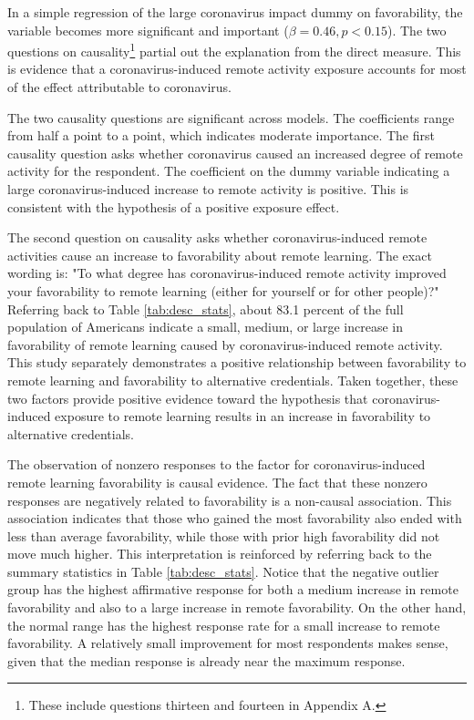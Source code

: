 \documentclass[review]{elsarticle}
\begin{document}
In a simple regression of the large coronavirus impact dummy on favorability,
the variable becomes more significant and important ($\beta = 0.46, p < 0.15$).
The two questions on causality\footnote{These include questions thirteen and fourteen in Appendix A.}
partial out the explanation from the direct measure.
This is evidence that a coronavirus-induced remote activity exposure accounts for most of the effect attributable to coronavirus.

The two causality questions are significant across models.
The coefficients range from half a point to a point, which indicates moderate importance.
The first causality question asks whether coronavirus caused an increased degree of remote activity for the respondent.
The coefficient on the dummy variable indicating a large coronavirus-induced increase to remote activity is positive.
This is consistent with the hypothesis of a positive exposure effect.

The second question on causality asks whether coronavirus-induced remote activities cause an increase
to favorability about remote learning.
The exact wording is:
"To what degree has coronavirus-induced remote activity improved your favorability to remote learning
(either for yourself or for other people)?"
Referring back to Table \ref{tab:desc_stats},
about 83.1 percent of the full population of Americans indicate a small,
medium, or large increase in favorability of remote learning
caused by coronavirus-induced remote activity.
This study separately demonstrates a positive relationship between favorability to remote learning
and favorability to alternative credentials.
Taken together,
these two factors provide positive evidence toward the hypothesis that coronavirus-induced exposure to remote learning
results in an increase in favorability to alternative credentials.

The observation of nonzero responses to the factor for coronavirus-induced remote learning favorability is causal evidence.
The fact that these nonzero responses are negatively related to favorability is a non-causal association.
This association indicates that those who gained the most favorability also ended with less than average favorability,
while those with prior high favorability did not move much higher.
This interpretation is reinforced by referring back to the summary statistics in Table \ref{tab:desc_stats}.
Notice that the negative outlier group has the highest affirmative response for both a
medium increase in remote favorability
and also to a large increase in remote favorability.
On the other hand, the normal range has the highest response rate for a small increase to remote favorability.
A relatively small improvement for most respondents makes sense,
given that the median response is already near the maximum response.
\end{document}
